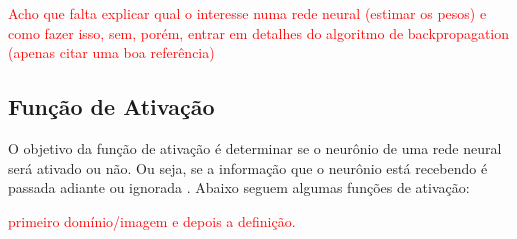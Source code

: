 \documentclass{automatextcc}
\newcommand{\pumi}[1]{\textcolor{red}{#1}}
\begin{document}

\pumi{Acho que falta explicar qual o interesse numa rede neural (estimar os pesos) e como fazer isso, sem, porém, entrar em detalhes do algoritmo de backpropagation (apenas citar uma boa referência)}

\subsection{Função de Ativação}
O objetivo da função de ativação é determinar se o neurônio de uma rede neural será ativado ou não. Ou seja, se a informação que o neurônio está recebendo é passada adiante ou ignorada \citep{dsa2021deeplearningbook}. Abaixo seguem algumas funções de ativação:

\pumi{primeiro domínio/imagem e depois a definição.}
\end{document}

